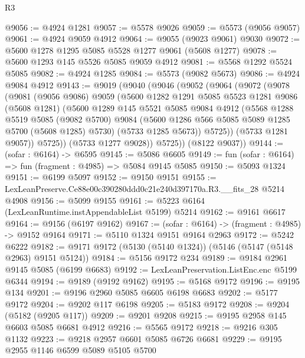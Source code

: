 \begin{lexlean}{R3}
\begin{coremodule}
@9056 := @4924 @1281
@9057 := @5578 @9026
@9059 := @5573 (@9056 @9057)
@9061 := @4924 @9059 @4912
@9064 := @9055 (@9023 @9061) @9030
@9072 := @5600 @1278 @1295 @5085 @5528 @1277 @9061 (@5608 @1277)
@9078 := @5600 @1293 @145 @5526 @5085 @9059 @4912
@9081 := @5568 @1292 @5524 @5085
@9082 := @4924 @1285
@9084 := @5573 (@9082 @5673)
@9086 := @4924 @9084 @4912
@9143 := @9019
    (@9040
      (@9046
        (@9052
          (@9064
            (@9072
              (@9078
                (@9081
                  (@9056 @9086)
                  @9059
                  (@5600
                    @1282
                    @1291
                    @5085
                    @5523
                    @1281
                    @9086
                    (@5608 @1281)
                    (@5600
                      @1289
                      @145
                      @5521
                      @5085
                      @9084
                      @4912
                      (@5568
                        @1288
                        @5519
                        @5085
                        (@9082 @5700)
                        @9084
                        (@5600 @1286 @566 @5085 @5089 @1285 @5700 (@5608 @1285) @5730)
                        (@5733 @1285 @5673))
                      @5725))
                  (@5733 @1281 @9057))
                @5725))
            (@5733 @1277 @9028))
          @5725))
      (@8122 @9037))
@9144 := (sofar : @6164) -> @6595
@9145 := @5086 @6605
@9149 := fun (sofar : @6164) => fun (fragment : @4985) => @5084 @9145 @5085
@9150 := @5093 @1324
@9151 := @6199 @5097
@9152 := @9150 @9151
@9155 := LexLeanPreserve.Ce88e00c390280ddd0c21e240d397170a.R3.__fits_28 @5214 @4908
@9156 := @5099 @9155
@9161 := @5223 @6164 (LexLeanRuntime.instAppendableList @5199) @5214
@9162 := @9161 @6617
@9164 := @9156 (@6197 @9162)
@9167 := (sofar : @6164) -> (fragment : @4985) -> @9152 @9164
@9171 := @5110 @1324 @9151 @9164 @2963
@9172 := @5242 @6222
@9182 := @9171 @9172 (@5130 (@5140 @1324)) (@5146 (@5147 (@5148 @2963) @9151 @5124))
@9184 := @5156 @9172 @234
@9189 := @9184 @2961 @9145 @5085 (@6199 @6683)
@9192 := LexLeanPreservation.ListEnc.enc @5199 @6344
@9194 := @9189 (@9192 @9162)
@9195 := @5168 @9172
@9196 := @9195 @134
@9201 := @9196 @2960 @5085 @6605 @6198 @6683
@9202 := @5177 @9172
@9204 := @9202 @117 @6198
@9205 := @5183 @9172
@9208 := @9204 (@5182 (@9205 @117))
@9209 := @9201 @9208
@9215 := @9195 @2958 @145 @6603 @5085 @6681 @4912
@9216 := @5565 @9172
@9218 := @9216 @305 @1132
@9223 := @9218 @2957 @6601 @5085 @6726 @6681
@9229 := @9195 @2955 @1146 @6599 @5089 @5105 @5700

\end{coremodule}
\end{lexlean}
